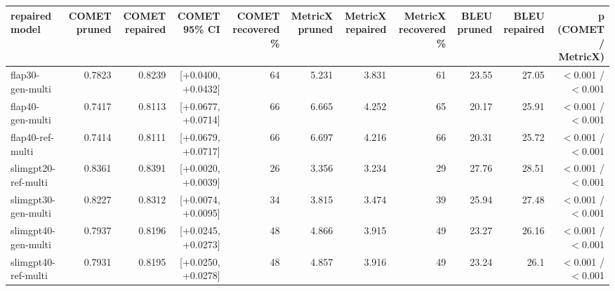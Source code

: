 \begin{tabular}{lrrrrrrrrrr}
\toprule
repaired model & COMET pruned & COMET repaired & COMET 95\% CI & COMET recovered \% & MetricX pruned & MetricX repaired & MetricX recovered \% & BLEU pruned & BLEU repaired & p (COMET / MetricX) \\
\midrule
flap30-gen-multi & 0.7823 & 0.8239 & [+0.0400, +0.0432] & 64 & 5.231 & 3.831 & 61 & 23.55 & 27.05 & $<$0.001 / $<$0.001 \\
flap40-gen-multi & 0.7417 & 0.8113 & [+0.0677, +0.0714] & 66 & 6.665 & 4.252 & 65 & 20.17 & 25.91 & $<$0.001 / $<$0.001 \\
flap40-ref-multi & 0.7414 & 0.8111 & [+0.0679, +0.0717] & 66 & 6.697 & 4.216 & 66 & 20.31 & 25.72 & $<$0.001 / $<$0.001 \\
slimgpt20-ref-multi & 0.8361 & 0.8391 & [+0.0020, +0.0039] & 26 & 3.356 & 3.234 & 29 & 27.76 & 28.51 & $<$0.001 / $<$0.001 \\
slimgpt30-gen-multi & 0.8227 & 0.8312 & [+0.0074, +0.0095] & 34 & 3.815 & 3.474 & 39 & 25.94 & 27.48 & $<$0.001 / $<$0.001 \\
slimgpt40-gen-multi & 0.7937 & 0.8196 & [+0.0245, +0.0273] & 48 & 4.866 & 3.915 & 49 & 23.27 & 26.16 & $<$0.001 / $<$0.001 \\
slimgpt40-ref-multi & 0.7931 & 0.8195 & [+0.0250, +0.0278] & 48 & 4.857 & 3.916 & 49 & 23.24 & 26.1 & $<$0.001 / $<$0.001 \\
\bottomrule
\end{tabular}
